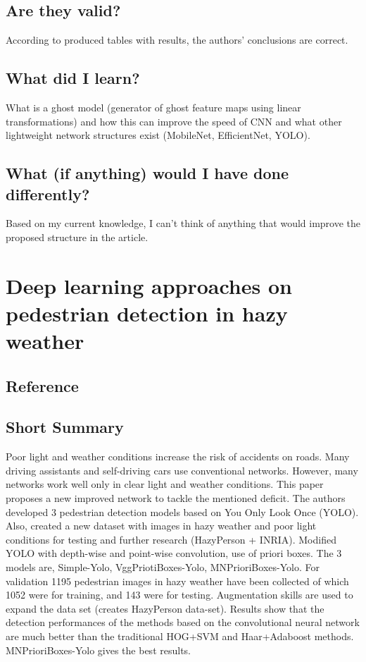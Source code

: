 \documentclass[11pt,a4paper]{article}
\begin{document}
\subsection*{Are they valid?}
According to produced tables with results, the authors’ conclusions are correct.

\subsection*{What did I learn?}
What is a ghost model (generator of ghost feature maps using linear transformations) and how this can improve the speed of CNN and what other lightweight network structures exist (MobileNet, EfficientNet, YOLO).

\subsection*{What (if anything) would I have done differently?}
Based on my current knowledge, I can’t think of anything that would improve the proposed structure in the article.
\newpage 

\section*{Deep learning approaches on pedestrian detection in hazy weather}
\subsection*{Reference}

\subsection*{Short Summary} 
Poor light and weather conditions increase the risk of accidents on roads. Many driving assistants and self-driving cars use conventional networks. However, many networks work well only in clear light and weather conditions. This paper proposes a new improved network to tackle the mentioned deficit. The authors developed 3 pedestrian detection models based on You Only Look Once (YOLO). Also, created a new dataset with images in hazy weather and poor light conditions for testing and further research (HazyPerson + INRIA). Modified YOLO with depth-wise and point-wise convolution, use of priori boxes. The 3 models are, Simple-Yolo, VggPriotiBoxes-Yolo, MNPrioriBoxes-Yolo. For validation 1195 pedestrian images in hazy weather have been collected of which 1052 were for training, and 143 were for testing. Augmentation skills are used to expand the data set (creates HazyPerson data-set). Results show that the detection performances of the methods based on the convolutional neural network are much better than the traditional HOG+SVM and Haar+Adaboost methods. MNPrioriBoxes-Yolo gives the best results.
\end{document}
